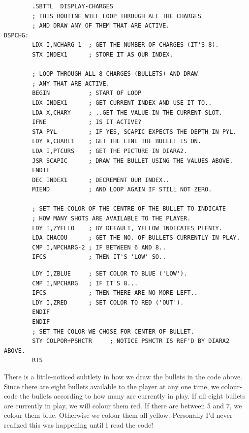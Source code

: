 \begin{lstlisting}
        .SBTTL  DISPLAY-CHARGES
        ; THIS ROUTINE WILL LOOP THROUGH ALL THE CHARGES
        ; AND DRAW ANY OF THEM THAT ARE ACTIVE.
DSPCHG:
        LDX I,NCHARG-1  ; GET THE NUMBER OF CHARGES (IT'S 8).
        STX INDEX1      ; STORE IT AS OUR INDEX.

        ; LOOP THROUGH ALL 8 CHARGES (BULLETS) AND DRAW
        ; ANY THAT ARE ACTIVE.
        BEGIN           ; START OF LOOP
        LDX INDEX1      ; GET CURRENT INDEX AND USE IT TO..
        LDA X,CHARY     ; ..GET THE VALUE IN THE CURRENT SLOT.
        IFNE            ; IS IT ACTIVE?
        STA PYL         ; IF YES, SCAPIC EXPECTS THE DEPTH IN PYL.
        LDY X,CHARL1    ; GET THE LINE THE BULLET IS ON.
        LDA I,PTCURS    ; GET THE PICTURE IN DIARA2.
        JSR SCAPIC      ; DRAW THE BULLET USING THE VALUES ABOVE.
        ENDIF
        DEC INDEX1      ; DECREMENT OUR INDEX..
        MIEND           ; AND LOOP AGAIN IF STILL NOT ZERO.

        ; SET THE COLOR OF THE CENTRE OF THE BULLET TO INDICATE
        ; HOW MANY SHOTS ARE AVAILABLE TO THE PLAYER.
        LDY I,ZYELLO    ; BY DEFAULT, YELLOW INDICATES PLENTY.
        LDA CHACOU      ; GET THE NO. OF BULLETS CURRENTLY IN PLAY.
        CMP I,NPCHARG-2 ; IF BETWEEN 6 AND 8..
        IFCS            ; THEN IT'S 'LOW' SO..
\end{lstlisting}
\begin{lstlisting}
        LDY I,ZBLUE     ; SET COLOR TO BLUE ('LOW').
        CMP I,NPCHARG   ; IF IT'S 8...
        IFCS            ; THEN THERE ARE NO MORE LEFT..
        LDY I,ZRED      ; SET COLOR TO RED ('OUT').
        ENDIF
        ENDIF
        ; SET THE COLOR WE CHOSE FOR CENTER OF BULLET.
        STY COLPOR+PSHCTR     ; NOTICE PSHCTR IS REF'D BY DIARA2 ABOVE.
        RTS
\end{lstlisting}

There is a little-noticed subtlety in how we draw the bullets in the code above. Since
there are eight bullets available to the player at any one time, we colour-code the bullets
according to how many are currently in play. If all eight bullets are currently in play, we
will colour them red. If there are between 5 and 7, we colour them blue. Otherwise we colour
them all yellow. Personally I'd never realized this was happening until I read the code!

